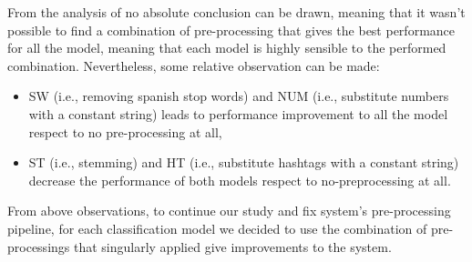 From the analysis of  no absolute conclusion can be drawn, meaning that it wasn't possible to find a combination of pre-processing that gives the best performance for all the model, meaning that each model is highly sensible to the performed combination. Nevertheless, some relative observation can be made:
\begin{itemize}
\item SW (i.e., removing spanish stop words) and NUM (i.e., substitute numbers with a constant string) leads to performance improvement to all the model respect to no pre-processing at all,
\item ST (i.e., stemming) and HT (i.e., substitute hashtags with a constant string) decrease the performance of both models respect to no-preprocessing at all.
\end{itemize}

From above observations, to continue our study and fix system's pre-processing pipeline, for each classification model we decided to use the combination of pre-processings that singularly applied give improvements to the system.

